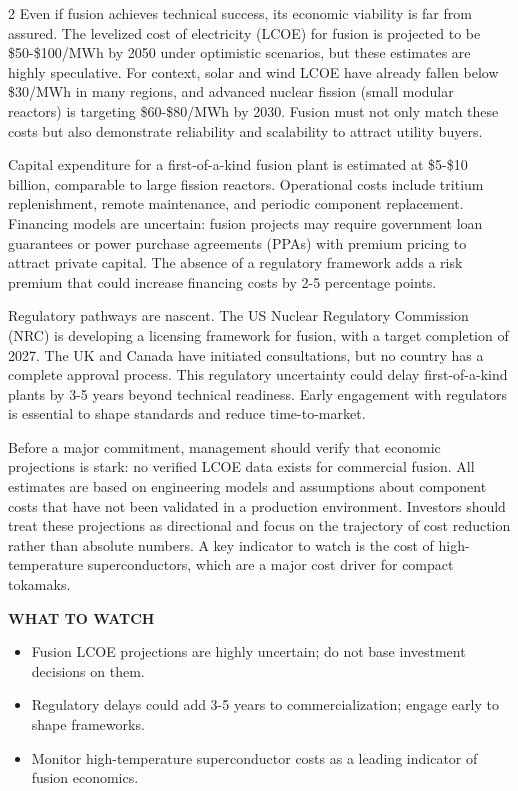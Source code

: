\documentclass[10pt,a4paper]{article}
\begin{document}
\begin{multicols}{2}
{\small Even if fusion achieves technical success, its economic viability is far from assured. The levelized cost of electricity (LCOE) for fusion is projected to be \$50-\$100/MWh by 2050 under optimistic scenarios, but these estimates are highly speculative. For context, solar and wind LCOE have already fallen below \$30/MWh in many regions, and advanced nuclear fission (small modular reactors) is targeting \$60-\$80/MWh by 2030. Fusion must not only match these costs but also demonstrate reliability and scalability to attract utility buyers.}\par
{\small Capital expenditure for a first-of-a-kind fusion plant is estimated at \$5-\$10 billion, comparable to large fission reactors. Operational costs include tritium replenishment, remote maintenance, and periodic component replacement. Financing models are uncertain: fusion projects may require government loan guarantees or power purchase agreements (PPAs) with premium pricing to attract private capital. The absence of a regulatory framework adds a risk premium that could increase financing costs by 2-5 percentage points.}\par
{\small Regulatory pathways are nascent. The US Nuclear Regulatory Commission (NRC) is developing a licensing framework for fusion, with a target completion of 2027. The UK and Canada have initiated consultations, but no country has a complete approval process. This regulatory uncertainty could delay first-of-a-kind plants by 3-5 years beyond technical readiness. Early engagement with regulators is essential to shape standards and reduce time-to-market.}\par
{\small Before a major commitment, management should verify that economic projections is stark: no verified LCOE data exists for commercial fusion. All estimates are based on engineering models and assumptions about component costs that have not been validated in a production environment. Investors should treat these projections as directional and focus on the trajectory of cost reduction rather than absolute numbers. A key indicator to watch is the cost of high-temperature superconductors, which are a major cost driver for compact tokamaks.}\par
\end{multicols}
\vspace{4pt}\noindent\begin{minipage}{\linewidth}
{\textcolor{BOGreen}{\scriptsize\bfseries WHAT TO WATCH}}\par\vspace{2pt}
{\footnotesize\begin{itemize}
\item Fusion LCOE projections are highly uncertain; do not base investment decisions on them.
\item Regulatory delays could add 3-5 years to commercialization; engage early to shape frameworks.
\item Monitor high-temperature superconductor costs as a leading indicator of fusion economics.
\end{itemize}}
\end{minipage}
\label{chap:2:end}
\end{document}
